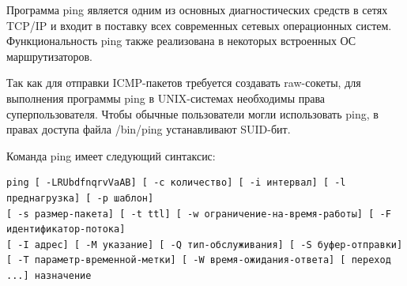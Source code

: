 \documentclass[a4paper]{article}
\begin{document}
			Программа ping является одним из основных диагностических средств в сетях TCP/IP и входит в поставку всех современных сетевых операционных систем. Функциональность ping также реализована в некоторых встроенных ОС маршрутизаторов.
			
			Так как для отправки ICMP-пакетов требуется создавать raw-сокеты, для выполнения программы ping в UNIX-системах необходимы права суперпользователя. Чтобы обычные пользователи могли использовать ping, в правах доступа файла /bin/ping устанавливают SUID-бит.
			
			Команда ping имеет следующий синтаксис:
			\begin{verbatim}
ping [ -LRUbdfnqrvVaAB] [ -c количество] [ -i интервал] [ -l преднагрузка] [ -p шаблон]
[ -s размер-пакета] [ -t ttl] [ -w ограничение-на-время-работы] [ -F идентификатор-потока]
[ -I адрес] [ -M указание] [ -Q тип-обслуживания] [ -S буфер-отправки]
[ -T параметр-временной-метки] [ -W время-ожидания-ответа] [ переход ...] назначение
			\end{verbatim}
			
\end{document}
